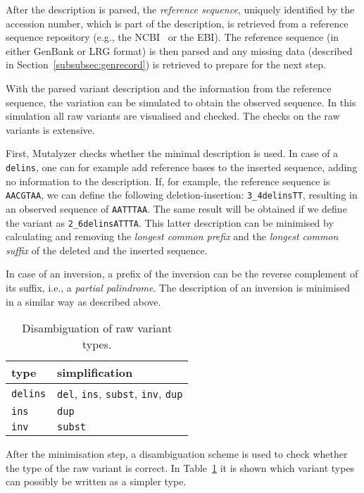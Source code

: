 \documentclass{article}
\begin{document}
After the description is parsed, the \emph{reference sequence}, uniquely
identified by the accession number, which is part of the description, is
retrieved from a reference sequence repository (e.g., the NCBI~\cite{NCBI} or
the EBI). The reference sequence (in either GenBank or LRG format) is then
parsed and any missing data (described in Section~\ref{subsubsec:genrecord}) is
retrieved to prepare for the next step.

With the parsed variant description and the information from the reference
sequence, the variation can be simulated to obtain the observed sequence. In
this simulation all raw variants are visualised and checked. The checks on the
raw variants is extensive.

First, Mutalyzer checks whether the minimal description is used. In case of a
\texttt{delins}, one can for example add reference bases to the inserted
sequence, adding no information to the description. If, for example, the
reference sequence is \texttt{AACGTAA}, we can define the following
deletion-insertion: \texttt{3\_4delinsTT}, resulting in an observed sequence of
\texttt{AATTTAA}. The same result will be obtained if we define the variant as
\texttt{2\_6delinsATTTA}. This latter description can be minimised by
calculating and removing the \emph{longest common prefix} and the \emph{longest
common suffix} of the deleted and the inserted sequence.

In case of an inversion, a prefix of the inversion can be the reverse
complement of its suffix, i.e., a \emph{partial palindrome}. The
description of an inversion is minimised in a similar way as described above.

\begin{table}
  \begin{center}
    \caption{Disambiguation of raw variant types.}
    \begin{tabular}{l|l}
      type            & simplification\\
      \hline
      \texttt{delins} & \texttt{del}, \texttt{ins}, \texttt{subst},
        \texttt{inv}, \texttt{dup}\\
      \texttt{ins}    & \texttt{dup}\\
      \texttt{inv}    & \texttt{subst}
    \end{tabular}
  \end{center}
  \label{tab:typedisambiguation}
\end{table}

After the minimisation step, a disambiguation scheme is used to check whether
the type of the raw variant is correct. In Table~\ref{tab:typedisambiguation}
it is shown which variant types can possibly be written as a simpler type.
\end{document}
